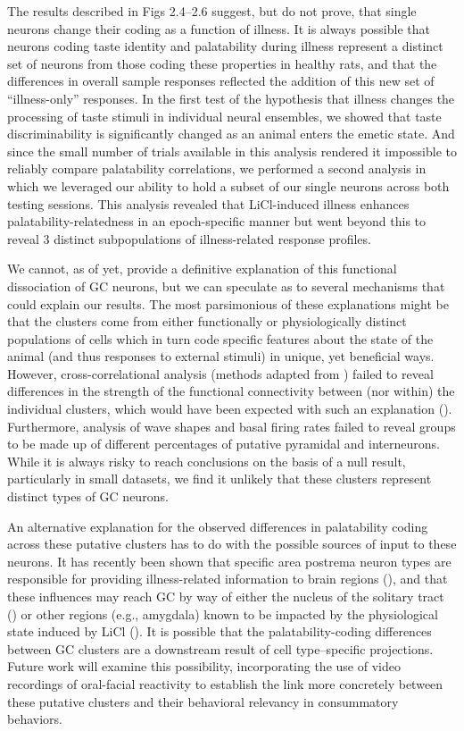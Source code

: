 \begin{refsection}
The results described in Figs 2.4–2.6 suggest, but do not prove, that single neurons change their coding as a function of illness. It is always possible that neurons coding taste identity and palatability during illness represent a distinct set of neurons from those coding these properties in healthy rats, and that the differences in overall sample responses reflected the addition of this new set of “illness-only” responses. In the first test of the hypothesis that illness changes the processing of taste stimuli in individual neural ensembles, we showed that taste discriminability is significantly changed as an animal enters the emetic state. And since the small number of trials available in this analysis rendered it impossible to reliably compare palatability correlations, we performed a second analysis in which we leveraged our ability to hold a subset of our single neurons across both testing sessions. This analysis revealed that LiCl-induced illness enhances palatability-relatedness in an epoch-specific manner but went beyond this to reveal 3 distinct subpopulations of illness-related response profiles.

We cannot, as of yet, provide a definitive explanation of this functional dissociation of GC neurons, but we can speculate as to several mechanisms that could explain our results. The most parsimonious of these explanations might be that the clusters come from either functionally or physiologically distinct populations of cells which in turn code specific features about the state of the animal (and thus responses to external stimuli) in unique, yet beneficial ways. However, cross-correlational analysis (methods adapted from \cite{li2013a}) failed to reveal differences in the strength of the functional connectivity between (nor within) the individual clusters, which would have been expected with such an explanation (\cite{li2013a}). Furthermore, analysis of wave shapes and basal firing rates failed to reveal groups to be made up of different percentages of putative pyramidal and interneurons. While it is always risky to reach conclusions on the basis of a null result, particularly in small datasets, we find it unlikely that these clusters represent distinct types of GC neurons.

An alternative explanation for the observed differences in palatability coding across these putative clusters has to do with the possible sources of input to these neurons. It has recently been shown that specific area postrema neuron types are responsible for providing illness-related information to brain regions (\cite{zhang2021a}), and that these influences may reach GC by way of either the nucleus of the solitary tract (\cite{shapiro1985a}) or other regions (e.g., amygdala) known to be impacted by the physiological state induced by LiCl (\cite{spencer2012a}). It is possible that the palatability-coding differences between GC clusters are a downstream result of cell type–specific projections. Future work will examine this possibility, incorporating the use of video recordings of oral-facial reactivity to establish the link more concretely between these putative clusters and their behavioral relevancy in consummatory behaviors.


\end{refsection}

